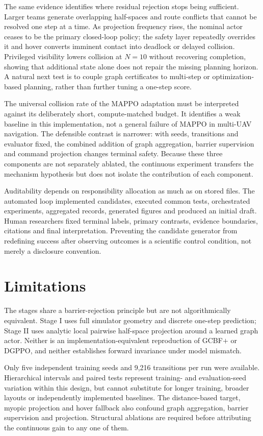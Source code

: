 \documentclass{article}
\begin{document}
The same evidence identifies where residual rejection stops being sufficient. Larger teams generate overlapping half-spaces and route conflicts that cannot be resolved one step at a time. As projection frequency rises, the nominal actor ceases to be the primary closed-loop policy; the safety layer repeatedly overrides it and hover converts imminent contact into deadlock or delayed collision. Privileged visibility lowers collision at $N=10$ without recovering completion, showing that additional state alone does not repair the missing planning horizon. A natural next test is to couple graph certificates to multi-step or optimization-based planning, rather than further tuning a one-step score.

The universal collision rate of the MAPPO adaptation must be interpreted against its deliberately short, compute-matched budget. It identifies a weak baseline in this implementation, not a general failure of MAPPO in multi-UAV navigation. The defensible contrast is narrower: with seeds, transitions and evaluator fixed, the combined addition of graph aggregation, barrier supervision and command projection changes terminal safety. Because these three components are not separately ablated, the continuous experiment transfers the mechanism hypothesis but does not isolate the contribution of each component.

Auditability depends on responsibility allocation as much as on stored files. The automated loop implemented candidates, executed common tests, orchestrated experiments, aggregated records, generated figures and produced an initial draft. Human researchers fixed terminal labels, primary contrasts, evidence boundaries, citations and final interpretation. Preventing the candidate generator from redefining success after observing outcomes is a scientific control condition, not merely a disclosure convention.

\section{Limitations}

The stages share a barrier-rejection principle but are not algorithmically equivalent. Stage I uses full simulator geometry and discrete one-step prediction; Stage II uses analytic local pairwise half-space projection around a learned graph actor. Neither is an implementation-equivalent reproduction of GCBF$+$ or DGPPO, and neither establishes forward invariance under model mismatch.

Only five independent training seeds and 9,216 transitions per run were available. Hierarchical intervals and paired tests represent training- and evaluation-seed variation within this design, but cannot substitute for longer training, broader layouts or independently implemented baselines. The distance-based target, myopic projection and hover fallback also confound graph aggregation, barrier supervision and projection. Structural ablations are required before attributing the continuous gain to any one of them.
\end{document}
